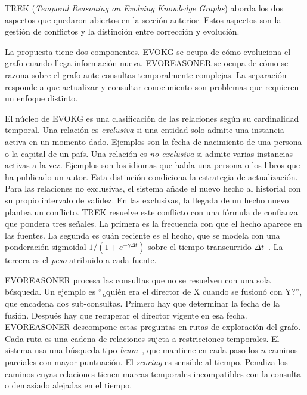 TREK (\emph{Temporal Reasoning on Evolving Knowledge Graphs}) \cite{trek2025} aborda los dos aspectos que quedaron abiertos en la sección anterior. Estos aspectos son la gestión de conflictos y la distinción entre corrección y evolución.

La propuesta tiene dos componentes. EVOKG \cite{trek2025} se ocupa de cómo evoluciona el grafo cuando llega información nueva. EVOREASONER \cite{trek2025} se ocupa de cómo se razona sobre el grafo ante consultas temporalmente complejas. La separación responde a que actualizar y consultar conocimiento son problemas que requieren un enfoque distinto.

El núcleo de EVOKG es una clasificación de las relaciones según su cardinalidad temporal. Una relación es \emph{exclusiva} si una entidad solo admite una instancia activa en un momento dado. Ejemplos son la fecha de nacimiento de una persona o la capital de un país. Una relación es \emph{no exclusiva} si admite varias instancias activas a la vez. Ejemplos son los idiomas que habla una persona o los libros que ha publicado un autor. Esta distinción condiciona la estrategia de actualización. Para las relaciones no exclusivas, el sistema añade el nuevo hecho al historial con su propio intervalo de validez. En las exclusivas, la llegada de un hecho nuevo plantea un conflicto. TREK resuelve este conflicto con una fórmula de confianza que pondera tres señales. La primera es la frecuencia con que el hecho aparece en las fuentes. La segunda es cuán reciente es el hecho, que se modela con una ponderación sigmoidal $1/(1+e^{-\gamma \Delta t})$ sobre el tiempo transcurrido $\Delta t$~\cite{trek2025}. La tercera es el \emph{peso} atribuido a cada fuente.

EVOREASONER procesa las consultas que no se resuelven con una sola búsqueda. Un ejemplo es ``¿quién era el director de X cuando se fusionó con Y?'', que encadena dos sub-consultas. Primero hay que determinar la fecha de la fusión. Después hay que recuperar el director vigente en esa fecha. EVOREASONER descompone estas preguntas en rutas de exploración del grafo. Cada ruta es una cadena de relaciones sujeta a restricciones temporales. El sistema usa una búsqueda tipo \emph{beam}~\cite{beam_search_placeholder}, que mantiene en cada paso los $n$ caminos parciales con mayor puntuación. El \emph{scoring} es sensible al tiempo. Penaliza los caminos cuyas relaciones tienen marcas temporales incompatibles con la consulta o demasiado alejadas en el tiempo.

